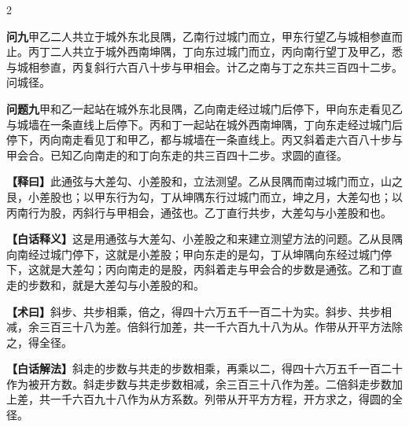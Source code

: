 \documentclass[11pt,a4paper]{article}
\newcommand{\WenQuestion}[1]{\textbf{\textcolor{classicalcolor}{#1}}}
\newcommand{\BaiQuestion}[1]{\textbf{\textcolor{moderncolor}{#1}}}
\newcommand{\WenExplain}{\textcolor{classicalcolor}{\textbf{【释曰】}}}
\newcommand{\BaiExplain}{\textcolor{moderncolor}{\textbf{【白话释义】}}}
\newcommand{\WenMethod}{\textcolor{classicalcolor}{\textbf{【术曰】}}}
\newcommand{\BaiMethod}{\textcolor{moderncolor}{\textbf{【白话解法】}}}
\begin{document}
\begin{paracol}{2}

\switchcolumn*
\begin{tcolorbox}[colback=red!3,colframe=red!30!black,boxrule=0.3pt]
\WenQuestion{问九}\quad 甲乙二人共立于城外东北艮隅，乙南行过城门而立，甲东行望乙与城相参直而止。丙丁二人共立于城外西南坤隅，丁向东过城门而立，丙向南行望丁及甲乙，悉与城相参直，丙复斜行六百八十步与甲相会。计乙之南与丁之东共三百四十二步。问城径。
\end{tcolorbox}
\switchcolumn
\begin{tcolorbox}[colback=blue!3,colframe=blue!30!black,boxrule=0.3pt]
\BaiQuestion{问题九}\quad 甲和乙一起站在城外东北艮隅，乙向南走经过城门后停下，甲向东走看见乙与城墙在一条直线上后停下。丙和丁一起站在城外西南坤隅，丁向东走经过城门后停下，丙向南走看见丁和甲乙，都与城墙在一条直线上。丙又斜着走六百八十步与甲会合。已知乙向南走的和丁向东走的共三百四十二步。求圆的直径。
\end{tcolorbox}

\switchcolumn*
\begin{tcolorbox}[colback=red!5,colframe=red!30!black,boxrule=0.3pt]
\WenExplain\quad 此通弦与大差勾、小差股和，立法测望。乙从艮隅而南过城门而立，山之艮，小差股也；以甲东行为勾，丁从坤隅东行过城门而立，坤之月，大差勾也；以丙南行为股，丙斜行与甲相会，通弦也。乙丁直行共步，大差勾与小差股和也。
\end{tcolorbox}
\switchcolumn
\begin{tcolorbox}[colback=blue!5,colframe=blue!30!black,boxrule=0.3pt]
\BaiExplain\quad 这是用通弦与大差勾、小差股之和来建立测望方法的问题。乙从艮隅向南经过城门停下，这就是小差股；甲向东走的是勾，丁从坤隅向东经过城门停下，这就是大差勾；丙向南走的是股，丙斜着走与甲会合的步数是通弦。乙和丁直走的步数和，就是大差勾与小差股的和。
\end{tcolorbox}

\switchcolumn*
\begin{tcolorbox}[colback=red!5,colframe=red!40!black,boxrule=0.3pt]
\WenMethod\quad 斜步、共步相乘，倍之，得四十六万五千一百二十为实。斜步、共步相减，余三百三十八为差。倍斜行加差，共一千六百九十八为从。作带从开平方法除之，得全径。
\end{tcolorbox}
\switchcolumn
\begin{tcolorbox}[colback=blue!5,colframe=blue!40!black,boxrule=0.3pt]
\BaiMethod\quad 斜走的步数与共走的步数相乘，再乘以二，得四十六万五千一百二十作为被开方数。斜走步数与共走步数相减，余三百三十八作为差。二倍斜走步数加上差，共一千六百九十八作为从方系数。列带从开平方方程，开方求之，得圆的全径。
\end{tcolorbox}


\end{paracol}
\end{document}
